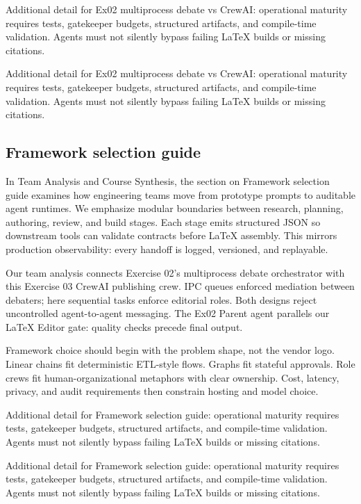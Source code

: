 Additional detail for Ex02 multiprocess debate vs CrewAI: operational maturity requires tests, gatekeeper budgets, structured artifacts, and compile-time validation. Agents must not silently bypass failing LaTeX builds or missing citations. \cite{crewai2024} \cite{langgraph2024}

Additional detail for Ex02 multiprocess debate vs CrewAI: operational maturity requires tests, gatekeeper budgets, structured artifacts, and compile-time validation. Agents must not silently bypass failing LaTeX builds or missing citations. \cite{crewai2024} \cite{langgraph2024}

\subsection{Framework selection guide}
In Team Analysis and Course Synthesis, the section on Framework selection guide examines how engineering teams move from prototype prompts to auditable agent runtimes. We emphasize modular boundaries between research, planning, authoring, review, and build stages. Each stage emits structured JSON so downstream tools can validate contracts before LaTeX assembly. This mirrors production observability: every handoff is logged, versioned, and replayable. \cite{crewai2024} \cite{langgraph2024}

Our team analysis connects Exercise 02's multiprocess debate orchestrator with this Exercise 03 CrewAI publishing crew. IPC queues enforced mediation between debaters; here sequential tasks enforce editorial roles. Both designs reject uncontrolled agent-to-agent messaging. The Ex02 Parent agent parallels our LaTeX Editor gate: quality checks precede final output. \cite{crewai2024} \cite{langgraph2024}

Framework choice should begin with the problem shape, not the vendor logo. Linear chains fit deterministic ETL-style flows. Graphs fit stateful approvals. Role crews fit human-organizational metaphors with clear ownership. Cost, latency, privacy, and audit requirements then constrain hosting and model choice. \cite{crewai2024} \cite{langgraph2024}

Additional detail for Framework selection guide: operational maturity requires tests, gatekeeper budgets, structured artifacts, and compile-time validation. Agents must not silently bypass failing LaTeX builds or missing citations. \cite{crewai2024} \cite{langgraph2024}

Additional detail for Framework selection guide: operational maturity requires tests, gatekeeper budgets, structured artifacts, and compile-time validation. Agents must not silently bypass failing LaTeX builds or missing citations. \cite{crewai2024} \cite{langgraph2024}

